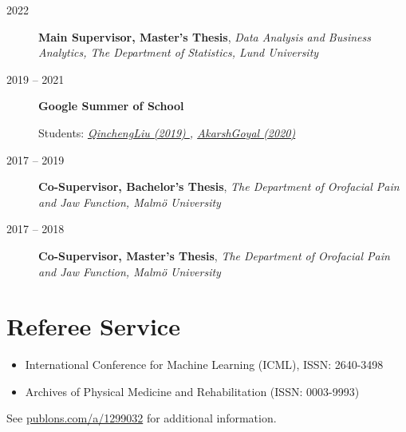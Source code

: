 \documentclass[
  10pt,
  headsepline=true,
  english,
  DIV=12
]{scrartcl}
\renewcommand*{%
  \mkbibnamegiven
}[1]{\ifitemannotation{highlight}{\textbf{#1}}{#1}}
\renewcommand*{%
  \mkbibnamefamily
}[1]{\ifitemannotation{highlight}{\textbf{#1}}{#1}}
\begin{document}
\begin{description}
  \item[2022] {
    \textbf{Main Supervisor, Master's Thesis}, \emph{Data Analysis and
    Business Analytics, The Department of Statistics, Lund University}

    }
  \item[2019 -- 2021]{
              \textbf{Google Summer of School}

              Students:
              \emph{
                \href{
                  https://summerofcode.withgoogle.com/archive/2019/projects/4654960430546944/
                }{
                  QinchengLiu (2019)
                },
                \href{
                  https://summerofcode.withgoogle.com/dashboard/project/5459519376719872/overview
                }{
                  AkarshGoyal (2020)
                }
              } }
  \item[2017 -- 2019] {
    \textbf{Co-Supervisor, Bachelor's Thesis}, \emph{The Department of
      Orofacial Pain and Jaw Function, Malmö University}

    }
  \item[2017 -- 2018] {
    \textbf{Co-Supervisor, Master's Thesis}, \emph{The Department of
      Orofacial Pain and Jaw Function, Malmö University}

    }
\end{description}

\section{Referee Service}

\begin{itemize}
  \item International Conference for Machine Learning (ICML), ISSN: 2640-3498
  \item Archives of Physical Medicine and Rehabilitation (ISSN: 0003-9993)
\end{itemize}
See \href{http://publons.com/a/1299032}{publons.com/a/1299032} for
additional information.
\end{document}
